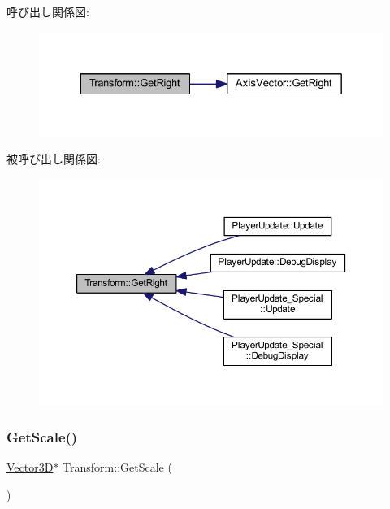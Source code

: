 呼び出し関係図\+:\nopagebreak
\begin{figure}[H]
\begin{center}
\leavevmode
\includegraphics[width=329pt]{class_transform_a57d1da919d8df7d2452149c4bbade4d2_cgraph}
\end{center}
\end{figure}
被呼び出し関係図\+:\nopagebreak
\begin{figure}[H]
\begin{center}
\leavevmode
\includegraphics[width=350pt]{class_transform_a57d1da919d8df7d2452149c4bbade4d2_icgraph}
\end{center}
\end{figure}
\mbox{\label{class_transform_accedf33a4ddbdcf2d4fc4274f85bf818}} 
\subsubsection{\texorpdfstring{Get\+Scale()}{GetScale()}}
{\footnotesize\ttfamily \mbox{\hyperlink{class_vector3_d}{Vector3D}}$\ast$ Transform\+::\+Get\+Scale (\begin{DoxyParamCaption}{ }\end{DoxyParamCaption})\hspace{0.3cm}{\ttfamily [inline]}}



